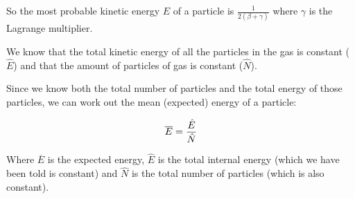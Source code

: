 \documentclass[10pt,\jkfside,a4paper]{article}
\begin{document}
\begin{enumerate}
So the most probable kinetic energy $E$ of a particle is $\frac{1}{2(\beta + \gamma)}$ where $\gamma$ 
is the Lagrange multiplier.

We know that the total kinetic energy of all the particles in the gas is constant ($\hat{E}$) 
and that the amount of particles of gas is constant ($\hat{N}$).

Since we know both the total number of particles and the total energy of those particles, 
we can work out the mean (expected) energy of a particle:

\begin{equation}
\overline{E} = \frac{\hat{E}}{\hat{N}} \\
\end{equation}

Where $\overline{E}$ is the expected energy, $\hat{E}$ is the total internal energy (which 
we have been told is constant) and $\hat{N}$ is the total number of particles (which 
is also constant).

\end{enumerate}
\end{document}
